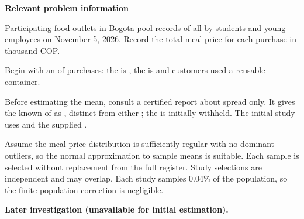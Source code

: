 \secInicio[][sec:p3]

\clearpage



\textbf{Relevant problem information}

\begin{probleminfoexcerpt}
Participating food outlets in Bogota pool records of all     by students and young employees on November 5, 2026. Record the total meal price for each purchase in thousand COP.
\end{probleminfoexcerpt}

\begin{probleminfoexcerpt}
Begin with an     of  purchases: the    is   , the    is    and  customers used a reusable container.
\end{probleminfoexcerpt}

\begin{probleminfoexcerpt}
Before estimating the mean, consult a certified report about spread only. It gives the known    of  as   , distinct from either   ; the   is initially withheld. The initial study uses   and the supplied      .
\end{probleminfoexcerpt}

\begin{probleminfoexcerpt}
Assume the meal-price distribution is sufficiently regular with no dominant outliers, so the normal approximation to sample means is suitable. Each sample is selected without replacement from the full register. Study selections are independent and may overlap. Each study samples 0.04\% of the population, so the finite-population correction is negligible.
\end{probleminfoexcerpt}

\textbf{Later investigation (unavailable for initial estimation).}

